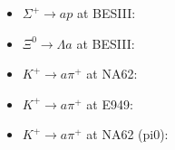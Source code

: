 \documentclass{article}
\begin{document}
\begin{itemize}
\item $\Sigma^+ \to a p$ at BESIII: \cite{BESIII:2023utd}
\item $\Xi^0 \to \Lambda a$ at BESIII: \cite{BESIII:2026ztz}
\item $K^+ \to a \pi^+$ at NA62: \cite{NA62:2025upx}
\item $K^+ \to a \pi^+$ at E949: \cite{BNL-E949:2009dza}
\item $K^+ \to a \pi^+$ at NA62 (pi0): \cite{NA62:2020pwi}
\end{itemize}


\end{document}
